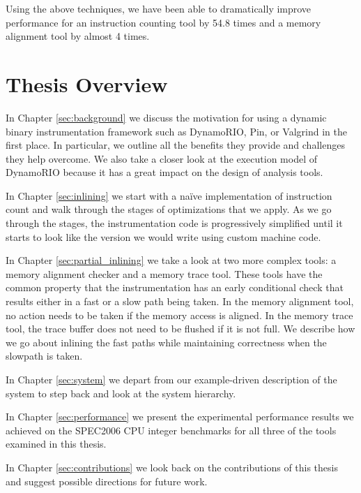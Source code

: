 
Using the above techniques, we have been able to dramatically improve
performance for an instruction counting tool by 54.8 times and a memory
alignment tool by almost 4 times.

\section{Thesis Overview}

In Chapter \ref{sec:background} we discuss the motivation for using a dynamic
binary instrumentation framework such as DynamoRIO, Pin, or Valgrind in the
first place.  In particular, we outline all the benefits they provide and
challenges they help overcome.  We also take a closer look at the execution
model of DynamoRIO because it has a great impact on the design of analysis
tools.

In Chapter \ref{sec:inlining} we start with a na\"ive implementation of
instruction count and walk through the stages of optimizations that we apply.
As we go through the stages, the instrumentation code is progressively
simplified until it starts to look like the version we would write using custom
machine code.

In Chapter \ref{sec:partial_inlining} we take a look at two more complex tools:
a memory alignment checker and a memory trace tool.  These tools have the common
property that the instrumentation has an early conditional check that results
either in a fast or a slow path being taken.  In the memory alignment tool, no
action needs to be taken if the memory access is aligned.  In the memory trace
tool, the trace buffer does not need to be flushed if it is not full.  We
describe how we go about inlining the fast paths while maintaining correctness
when the slowpath is taken.

In Chapter \ref{sec:system} we depart from our example-driven description of
the system to step back and look at the system hierarchy.

In Chapter \ref{sec:performance} we present the experimental performance results
we achieved on the SPEC2006 CPU integer benchmarks\cite{spec_cpu_2k6} for all
three of the tools examined in this thesis.

In Chapter \ref{sec:contributions} we look back on the contributions of this
thesis and suggest possible directions for future work.
